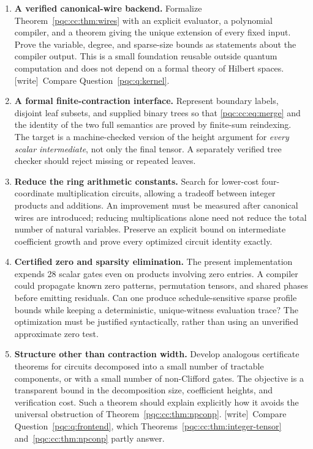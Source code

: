 \documentclass[11pt,letterpaper]{article}
\numberwithin{equation}{section}
\theoremstyle{definition}
\theoremstyle{remark}
\newcommand{\wtag}{\textup{[write]}}
\begin{document}
\begin{enumerate}[label=\textbf{\arabic*.},itemsep=0.7em]
\item \textbf{A verified canonical-wire backend.}
Formalize Theorem~\ref{pqc:cc:thm:wires} with an explicit evaluator, a polynomial
compiler, and a theorem giving the unique extension of every fixed input.
Prove the variable, degree, and sparse-size bounds as statements about the
compiler output. This is a small foundation reusable outside quantum
computation and does not depend on a formal theory of Hilbert spaces. \wtag\ Compare Question~\ref{pqc:q:kernel}.

\item \textbf{A formal finite-contraction interface.}
Represent boundary labels, disjoint leaf subsets, and supplied binary trees
so that \eqref{pqc:cc:eq:merge} and the identity of the two full semantics are proved
by finite-sum reindexing. The target is a machine-checked version of the height
argument for \emph{every scalar intermediate}, not only the final tensor.
A separately verified tree checker should reject missing or repeated leaves.

\item \textbf{Reduce the ring arithmetic constants.}
Search for lower-cost four-coordinate multiplication circuits, allowing a
tradeoff between integer products and additions. An improvement must be
measured after canonical wires are introduced; reducing multiplications alone
need not reduce the total number of natural variables. Preserve an explicit
bound on intermediate coefficient growth and prove every optimized circuit
identity exactly.

\item \textbf{Certified zero and sparsity elimination.}
The present implementation expends 28 scalar gates even on products involving
zero entries. A compiler could propagate known zero patterns, permutation
tensors, and shared phases before emitting residuals. Can one produce
schedule-sensitive sparse profile bounds while keeping a deterministic,
unique-witness evaluation trace? The optimization must be justified
syntactically, rather than using an unverified approximate zero test.

\item \textbf{Structure other than contraction width.}
Develop analogous certificate theorems for circuits decomposed into a small
number of tractable components, or with a small number of non-Clifford gates.
The objective is a transparent bound in the decomposition size, coefficient
heights, and verification cost. Such a theorem should explain explicitly how
it avoids the universal obstruction of Theorem~\ref{pqc:cc:thm:npconp}. \wtag\ Compare Question~\ref{pqc:q:frontend}, which Theorems~\ref{pqc:cc:thm:integer-tensor} and~\ref{pqc:cc:thm:npconp} partly answer.


\end{enumerate}
\end{document}
